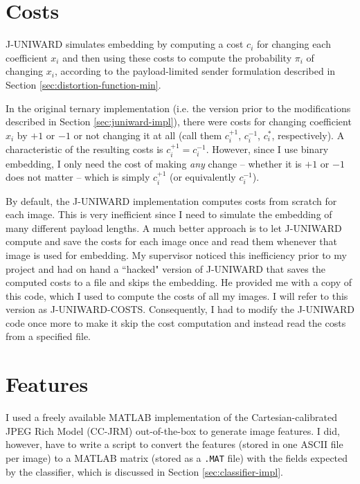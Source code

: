 \documentclass[11pt,a4paper,twoside,openright]{report}
\begin{document}
\section{Costs} \label{sec:costs}

J-UNIWARD simulates embedding by computing a cost $c_i$ for changing each coefficient $x_i$ and then using these costs to compute the probability $\pi_i$ of changing $x_i$, according to the payload-limited sender formulation described in Section \ref{sec:distortion-function-min}.

In the original ternary implementation (i.e. the version prior to the modifications described in Section \ref{sec:juniward-impl}), there were costs for changing coefficient $x_i$ by $+1$ or $-1$ or not changing it at all (call them $c_i^{+1}$, $c_i^{-1}$, $c_i^{\ast}$, respectively). A characteristic of the resulting costs is $c_i^{+1} = c_i^{-1}$. However, since I use binary embedding, I only need the cost of making \textit{any} change -- whether it is $+1$ or $-1$ does not matter -- which is simply $c_i^{+1}$ (or equivalently $c_i^{-1}$).

By default, the J-UNIWARD implementation computes costs from scratch for each image. This is very inefficient since I need to simulate the embedding of many different payload lengths. A much better approach is to let J-UNIWARD compute and save the costs for each image once and read them whenever that image is used for embedding. My supervisor noticed this inefficiency prior to my project and had on hand a ``hacked" version of J-UNIWARD that saves the computed costs to a file and skips the embedding. He provided me with a copy of this code, which I used to compute the costs of all my images. I will refer to this version as J-UNIWARD-COSTS. Consequently, I had to modify the J-UNIWARD code once more to make it skip the cost computation and instead read the costs from a specified file.


\section{Features} \label{sec:features-impl}

I used a freely available \cite{binghamton-features} MATLAB implementation of the Cartesian-calibrated JPEG Rich Model (CC-JRM) out-of-the-box to generate image features. I did, however, have to write a script to convert the features (stored in one ASCII file per image) to a MATLAB matrix (stored as a \texttt{.MAT} file) with the fields expected by the classifier, which is discussed in Section \ref{sec:classifier-impl}.
\end{document}
